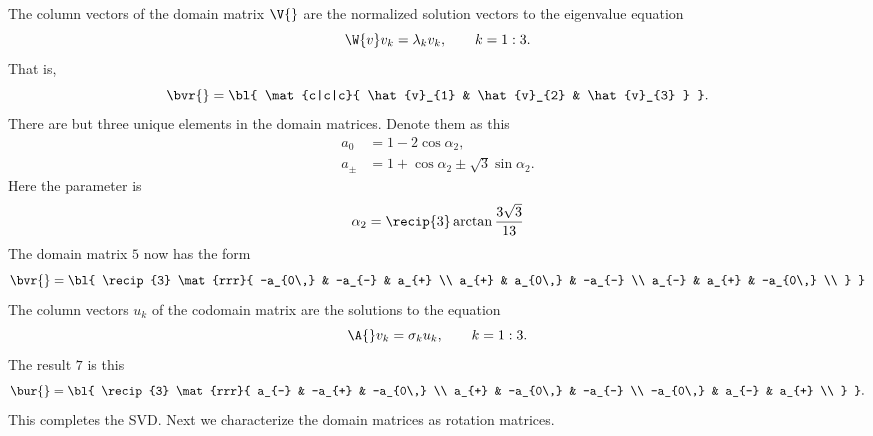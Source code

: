 The column vectors of the domain matrix $\V{}$ are the normalized solution vectors to the eigenvalue equation
\begin{equation}
  \W{v} v_{k} = \lambda_{k} v_{k}, \qquad k=1:3.
\end{equation}
That is,
\begin{equation}
  \bvr{} = {\bl{ \mat{c|c|c}{ \hat{v}_{1} & \hat{v}_{2} & \hat{v}_{3} } }}.
\end{equation}
There are but three unique elements in the domain matrices. Denote them as this
\begin{equation}
  \begin{split}
    a_{0\,}   &= 1 - 2\cos \alpha_{2}, \\
    a_{\pm} &= 1 +  \cos \alpha_{2} \pm \sqrt{3} \sin \alpha_{2} .
  \end{split}
\end{equation}
Here the parameter is
\begin{equation}
  \alpha_{2} = \recip{3} \arctan \frac{3 \sqrt{3}} {13}
\end{equation}
%
The domain matrix $\boxed{5}$ now has the form
%
\begin{equation}
  \bvr{} = {\bl{ \recip{3} \mat{rrr}{
  -a_{0\,} & -a_{-} &  a_{+} \\
   a_{+} &  a_{0\,} & -a_{-} \\
   a_{-} &  a_{+} & -a_{0\,} \\
  } }}
\end{equation}
%
The column vectors $u_{k}$ of the codomain matrix are the solutions to the equation
\begin{equation}
  \A{} v_{k} = \sigma_{k} u_{k}, \qquad k=1:3.
\end{equation}
The result  $\boxed{7}$  is this
%
\begin{equation}
  \bur{} = {\bl{ \recip{3} \mat{rrr}{
   a_{-} & -a_{+} & -a_{0\,} \\
   a_{+} & -a_{0\,} & -a_{-} \\
  -a_{0\,} &  a_{-} &  a_{+} \\
  } }} .
\end{equation}
%
This completes the SVD. Next we characterize the domain matrices as rotation matrices.


